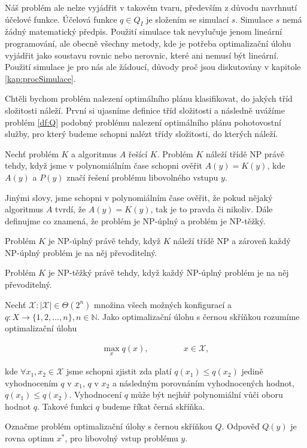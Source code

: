Náš problém ale nelze vyjádřit v takovém tvaru, především z důvodu navrhnutí účelové funkce.
Účelová funkce $q \in Q_I$ je složením se simulací $s$. Simulace $s$ nemá žádný matematický předpis.
Použití simulace tak nevylučuje jenom lineární programování, ale obecně všechny metody, kde je potřeba optimalizační úlohu vyjádřit jako
soustavu rovnic nebo nerovnic, které ani nemusí být lineární.
Použití simulace je pro nás ale žádoucí, důvody proč jsou diskutovány v kapitole \ref{kap:procSimulace}.

Chtěli bychom problém nalezení optimálního plánu klasifikovat, do jakých tříd složitosti náleží.
První si ujasníme definice tříd složitosti a následně uvážíme problém \ref{df:Q} podobný problému nalezení optimálního plánu pohotovostní služby,
pro který budeme schopni nalézt třídy složitosti, do kterých náleží.

\begin{definice}\label{df:NP}
  Nechť problém $K$ a algoritmus $A$ řešící $K$.
  Problém $K$ náleží třídě NP právě tehdy, když jsme v polynomiálním čase schopni ověřit
  $A(y) = K(y)$, kde $A(y)$ a $P(y)$ značí řešení problému libovolného vstupu $y$.
\end{definice}

Jinými slovy, jsme schopni v polynomiálním čase ověřit, že pokud nějaký algoritmus $A$ tvrdí, že $A(y) = K(y)$, tak je to pravda či nikoliv.
Dále definujme co znamená, že problém je NP-úplný a problém je NP-těžký.

\begin{definice}\label{df:NPup}
  Problém $K$ je NP-úplný právě tehdy, když $K$ náleží třídě NP a zároveň každý NP-úplný problém je na něj převoditelný.
\end{definice}

\begin{definice}\label{df:NPhard}
  Problém $K$ je NP-těžký právě tehdy, když každý NP-úplný problém je na něj převoditelný.
\end{definice}

\begin{definice}\label{df:Q}
  Nechť $\mathcal{X} \colon |\mathcal{X}| \in \Theta(2^n)$ množina všech možných konfigurací a $q \colon X \rightarrow \{ 1, 2, \dots, n \}, n \in \mathbb{N}$.
  Jako optimalizační úlohu s černou skříňkou rozumíme optimalizační úlohu

  \begin{align*}
    \max_{x} q(x), \hspace{50pt} x \in \mathcal{X},
  \end{align*}

  kde $\forall x_1, x_2 \in \mathcal{X}$ jsme schopni zjistit zda platí $q(x_1) \leq q(x_2)$ jedině vyhodnocením $q$ v $x_1$,
  $q$ v $x_2$ a následným porovnáním vyhodnocených hodnot, $q(x_1) \leq q(x_2)$.
  Vyhodnocení $q$ může být nejhůř polynomiální vůči oboru hodnot $q$.
  Takové funkci $q$ budeme říkat černá skříňka.

  Označme problém optimalizační úlohy s černou skříňkou $Q$.
  Odpověď $Q(y)$ je rovna optimu $x^*$, pro libovolný vstup problému $y$.
\end{definice}

